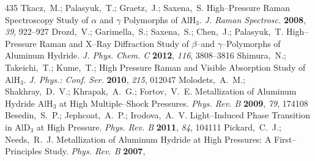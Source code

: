 \documentclass[12pt,letterpaper,oneside]{article}
\begin{document}
\begin{mcitethebibliography}{435}
\mciteBstWouldAddEndPuncttrue
\mciteSetBstMidEndSepPunct{\mcitedefaultmidpunct}
{\mcitedefaultendpunct}{\mcitedefaultseppunct}\relax
\EndOfBibitem
{}
Tkacz,~M.; Palasyuk,~T.; Graetz,~J.; Saxena,~S. High--Pressure Raman
  Spectroscopy Study of $\alpha$ and $\gamma$ Polymorphs of AlH$_3$. \emph{J.
  Raman Spectrosc.} \textbf{2008}, \emph{39}, 922--927\relax
\mciteBstWouldAddEndPuncttrue
\mciteSetBstMidEndSepPunct{\mcitedefaultmidpunct}
{\mcitedefaultendpunct}{\mcitedefaultseppunct}\relax
\EndOfBibitem
{}
Drozd,~V.; Garimella,~S.; Saxena,~S.; Chen,~J.; Palasyuk,~T. High--Pressure
  Raman and X--Ray Diffraction Study of $\beta$--and $\gamma$--Polymorphs of
  Aluminum Hydride. \emph{J. Phys. Chem. C} \textbf{2012}, \emph{116},
  3808--3816\relax
\mciteBstWouldAddEndPuncttrue
\mciteSetBstMidEndSepPunct{\mcitedefaultmidpunct}
{\mcitedefaultendpunct}{\mcitedefaultseppunct}\relax
\EndOfBibitem
{}
Shimura,~N.; Takeichi,~T.; Kume,~T.; 
  High Pressure Raman and Visible Absorption Study of AlH$_3$. \emph{J. Phys.:
  Conf. Ser.} \textbf{2010}, \emph{215}, 012047\relax
\mciteBstWouldAddEndPuncttrue
\mciteSetBstMidEndSepPunct{\mcitedefaultmidpunct}
{\mcitedefaultendpunct}{\mcitedefaultseppunct}\relax
\EndOfBibitem
{}
Molodets,~A.~M.; Shakhray,~D.~V.; Khrapak,~A.~G.; Fortov,~V.~E. Metallization
  of Aluminum Hydride AlH$_3$ at High Multiple--Shock Pressures. \emph{Phys.
  Rev. B} \textbf{2009}, \emph{79}, 174108\relax
\mciteBstWouldAddEndPuncttrue
\mciteSetBstMidEndSepPunct{\mcitedefaultmidpunct}
{\mcitedefaultendpunct}{\mcitedefaultseppunct}\relax
\EndOfBibitem
{}
Besedin,~S.~P.; Jephcoat,~A.~P.; Irodova,~A.~V. Light--Induced Phase Transition
  in AlD$_3$ at High Pressure. \emph{Phys. Rev. B} \textbf{2011}, \emph{84},
  104111\relax
\mciteBstWouldAddEndPuncttrue
\mciteSetBstMidEndSepPunct{\mcitedefaultmidpunct}
{\mcitedefaultendpunct}{\mcitedefaultseppunct}\relax
\EndOfBibitem
{}
Pickard,~C.~J.; Needs,~R.~J. Metallization of Aluminum Hydride at High
  Pressures: A First--Principles Study. \emph{Phys. Rev. B} \textbf{2007},

\end{mcitethebibliography}
\end{document}
